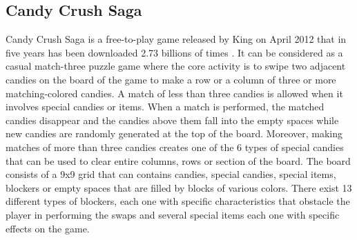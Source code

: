 \subsection{Candy Crush Saga}

Candy Crush Saga is a free-to-play game released by King on April 2012 that in five years has been downloaded 2.73 billions of times \cite{takahashi_candy_2017}. It can be considered as a casual match-three puzzle game where the core activity is to swipe two adjacent candies on the board of the game to make a row or a column of three or more matching-colored candies. A match of less than three candies is allowed when it involves special candies or items. When a match is performed, the matched candies disappear and the candies above them fall into the empty spaces while new candies are randomly generated at the top of the board. Moreover, making matches of more than three candies creates one of the 6 types of special candies that can be used to clear entire columns, rows or section of the board. The board consists of a 9x9 grid that can contains candies, special candies, special items, blockers or empty spaces that are filled by blocks of various colors. There exist 13 different types of blockers, each one with specific characteristics that obstacle the player in performing the swaps and several special items each one with specific effects on the game.

